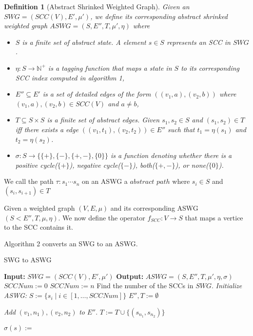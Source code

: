 \documentclass{article}
\newtheorem{definition}{Definition}
\begin{document}
\begin{definition}[Abstract Shrinked Weighted Graph]
	Given an $SWG = (SCC(V), E', \mu') $, we define its corresponding abstract shrinked weighted graph $ASWG = (S, E'', T, \mu', \eta)$ where 
\begin{itemize}
\item $S$ is a finite set of abstract state. A element  $s\in S$ represents an SCC in $SWG$.
\item $\eta: S\rightarrow \mathbb{N}^+$ is a tagging function that maps a state in $S$ to its corresponding SCC index computed in algorithm 1,
\item $E'' \subseteq E'$ is a set of detailed edges of the form $((v_1,a), (v_2, b))$ where $(v_1, a), (v_2, b)\in SCC(V)$ and $a \ne b$,
\item $T\subseteq S \times S$ is a finite set of abstract edges. Given $s_1, s_2\in S$ and $(s_1, s_2)\in T$ iff there exists a edge $((v_1,t_1), (v_2, t_2))\in E''$ such that $t_1 = \eta(s_1)$ and $t_2 = \eta(s_2)$. 
\item $\sigma: S\rightarrow \{\{+\}, \{-\}, \{+,-\}, \{0\}\}$ is a function denoting whether there is a positive cycle($\{+\}$), negative cycle($\{-\}$), both($\{+,-\}$), or none($\{0\}$).

 
\end{itemize}
\end{definition}

We call the path $\tau: s_1\cdots s_n$ on an ASWG a $abstract $ $path$ where $s_i\in S$ and $(s_i, s_{i+1})\in T$

Given a weighted graph $(V,E,\mu)$ and its corresponding ASWG $(S<E'',T,\mu,\eta)$. We now define the operator $f_{SCC}: V\rightarrow S$ that maps a vertice to the SCC contains it. 

Algorithm 2 converts an SWG to an ASWG.




\begin{algorithm}
	\caption{SWG to ASWG}
	\begin{algorithmic}
		\State {}
		\State \textbf{Input: }$SWG = (SCC(V), E', \mu')$
		\State \textbf{Output: }$ASWG = (S, E'',T, \mu', \eta, \sigma)$
		\State 		
		\State $SCCNum := 0$	
				\State $SCCNum := n$
				\Comment Find the number of the SCCs in $SWG$.
			\EndIf
		\EndFor
		\State\textit{Initialize ASWG:} 
		\State $S := \{s_i\mid i\in [1,\ldots, SCCNum]\}$
		\State $E'', T := \emptyset$
		
		
				\State \textit{Add }$(v_1, n_1),(v_2, n_2)$ \textit{to }$E''$.
					\State $T := T \cup \{(s_{n_1}, s_{n_2})\}$
				\EndIf
				
			\EndIf
		\EndFor
		\State 
			\State $\sigma(s) :=$ 
		\EndFor
		\EndFunction
	\end{algorithmic}

\end{algorithm}
\end{document}
